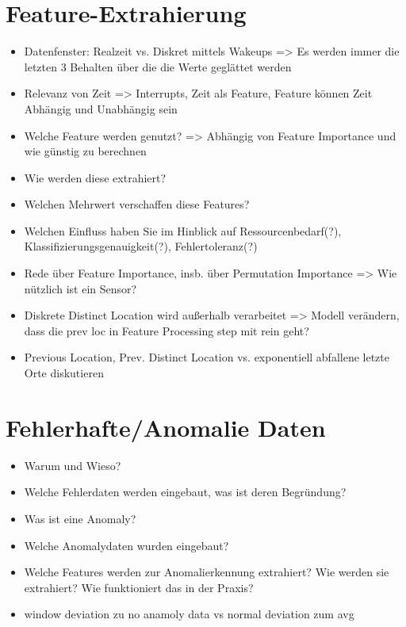 \section{Feature-Extrahierung}
\begin{itemize}
    \item Datenfenster: Realzeit vs. Diskret mittels Wakeups => Es werden immer die letzten 3 Behalten über die die Werte geglättet werden
    \item Relevanz von Zeit => Interrupts, Zeit als Feature, Feature können Zeit Abhängig und Unabhängig sein
    \item Welche Feature werden genutzt? => Abhängig von Feature Importance und wie günstig zu berechnen
    \item Wie werden diese extrahiert?
    \item Welchen Mehrwert verschaffen diese Features?
    \item Welchen Einfluss haben Sie im Hinblick auf Ressourcenbedarf(?), Klassifizierungsgenauigkeit(?), Fehlertoleranz(?)
    \item Rede über Feature Importance, insb. über Permutation Importance => Wie nützlich ist ein Sensor?
    \item Diskrete Distinct Location wird außerhalb verarbeitet => Modell verändern, dass die prev loc in Feature Processing step mit rein geht?
    \item Previous Location, Prev. Distinct Location vs. exponentiell abfallene letzte Orte diskutieren
\end{itemize}

\section{Fehlerhafte/Anomalie Daten}
\label{sec:data_anomalie}
\begin{itemize}
    \item Warum und Wieso?
    \item Welche Fehlerdaten werden eingebaut, was ist deren Begründung?
    \item Was ist eine Anomaly?
    \item Welche Anomalydaten wurden eingebaut?
    \item Welche Features werden zur Anomalierkennung extrahiert? Wie werden sie extrahiert? Wie funktioniert das in der Praxis?
    \item window deviation zu no anamoly data vs normal deviation zum avg
\end{itemize}

